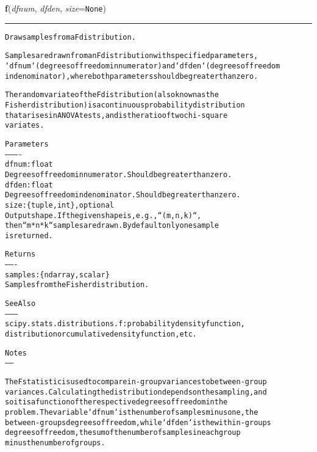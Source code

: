     \label{QSTK:qstklearn:mldiagnostics:f}

    \vspace{0.5ex}

\hspace{.8\funcindent}\begin{boxedminipage}{\funcwidth}

    \raggedright \textbf{f}(\textit{dfnum}, \textit{dfden}, \textit{size}={\tt None})

    \vspace{-1.5ex}

    \rule{\textwidth}{0.5\fboxrule}
\setlength{\parskip}{2ex}
\begin{alltt}
Draw samples from a F distribution.

Samples are drawn from an F distribution with specified parameters,
`dfnum` (degrees of freedom in numerator) and `dfden` (degrees of freedom
in denominator), where both parameters should be greater than zero.

The random variate of the F distribution (also known as the
Fisher distribution) is a continuous probability distribution
that arises in ANOVA tests, and is the ratio of two chi-square
variates.

Parameters
----------
dfnum : float
    Degrees of freedom in numerator. Should be greater than zero.
dfden : float
    Degrees of freedom in denominator. Should be greater than zero.
size : \{tuple, int\}, optional
    Output shape.  If the given shape is, e.g., ``(m, n, k)``,
    then ``m * n * k`` samples are drawn. By default only one sample
    is returned.

Returns
-------
samples : \{ndarray, scalar\}
    Samples from the Fisher distribution.

See Also
--------
scipy.stats.distributions.f : probability density function,
    distribution or cumulative density function, etc.

Notes
-----

The F statistic is used to compare in-group variances to between-group
variances. Calculating the distribution depends on the sampling, and
so it is a function of the respective degrees of freedom in the
problem.  The variable `dfnum` is the number of samples minus one, the
between-groups degrees of freedom, while `dfden` is the within-groups
degrees of freedom, the sum of the number of samples in each group
minus the number of groups.


\end{alltt}
\end{boxedminipage}
